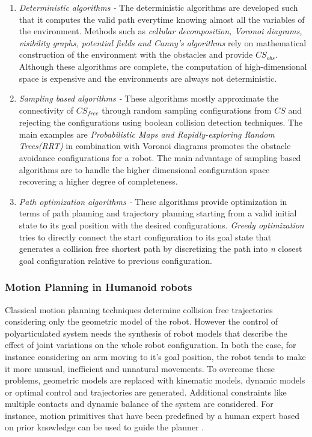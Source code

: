 \begin{enumerate}
    \item \textit{Deterministic algorithms -} The deterministic algorithms are developed such that it computes the valid path everytime knowing almost
    all the variables of the environment. Methods such as \textit{cellular decomposition, Voronoi diagrams, visibility graphs, potential fields and Canny's algorithms}
    rely on
    mathematical construction of the environment with the obstacles and provide $\mathit{CS_{obs}}$. Although these algorithms are complete, the computation
    of high-dimensional space is expensive and the environments are always not deterministic.

    \item \textit{Sampling based algorithms -} These algorithms mostly approximate the connectivity of $\mathit{CS_{free}}$ through random sampling configurations
    from $\mathit{CS}$ and rejecting the configurations using boolean collision detection techniques. The main examples are  \textit{Probabilistic Maps and
    Rapidly-exploring Random Trees(RRT)} in combination with Voronoi diagrams promotes the obstacle avoidance configurations for a robot. The main advantage of
    sampling based algorithms are to handle the higher dimensional configuration space recovering a higher degree of completeness.

    \item \textit{Path optimization algorithms -} These algorithms provide optimization in terms of path planning and trajectory planning starting from a valid
    initial state to its goal position with the desired configurations. \textit{Greedy optimization} tries to directly connect the start configuration to 
    its goal state that generates a collision free shortest path by discretizing the path into \textit{n} closest goal configuration relative to previous 
    configuration.
\end{enumerate}

\subsubsection{Motion Planning in Humanoid robots}

Classical motion planning techniques determine collision free trajectories considering only the geometric model of the robot. However the control of
polyarticulated system needs the synthesis of robot models that describe the effect of joint variations on the whole robot configuration. In both the case,
for instance considering an arm moving to it's goal position, the robot tends to make it more unusual, inefficient and unnatural movements. To overcome these 
problems, geometric models are replaced with kinematic models, dynamic models or optimal control and trajectories are generated. Additional constraints like
multiple contacts and dynamic balance of the system are considered. For instance, motion primitives that have been predefined by a human expert based on prior
knowledge can be used to guide the planner \cite{zhang2014motion}. 

